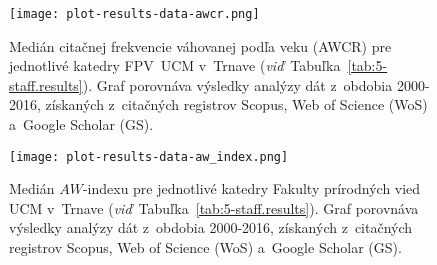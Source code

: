 \begin{figure}
  \centering
  \texttt{[image: plot-results-data-awcr.png]}
  \caption[Medián AWCR pre jednotlivé katedry FPV]%
  {Medián citačnej frekvencie váhovanej podľa veku (AWCR) pre jednotlivé katedry
    FPV~UCM v~Trnave (\emph{viď}~Tabuľka~\ref{tab:5-staff.results}).  Graf
    porovnáva výsledky analýzy dát z~obdobia 2000-2016, získaných z~citačných
    registrov Scopus, Web of Science (WoS) a~Google Scholar (GS).}
  \label{fig:awcr.plot}
\end{figure}

\begin{figure}
  \centering
  \texttt{[image: plot-results-data-aw\_index.png]}
  \caption[Medián $AW$-indexu pre jednotlivé katedry FPV~UCM]%
  {Medián $AW$-indexu pre jednotlivé katedry Fakulty prírodných vied UCM
    v~Trnave (\emph{viď}~Tabuľka~\ref{tab:5-staff.results}).  Graf porovnáva
    výsledky analýzy dát z~obdobia 2000-2016, získaných z~citačných registrov
    Scopus, Web of Science (WoS) a~Google Scholar (GS).}
  \label{fig:aw-index.plot}
\end{figure}

